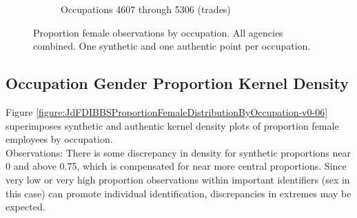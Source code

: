 \documentclass[10pt, letterpaper]{article}
\begin{document}
\begin{spacing}{1.0}
\begin{figure}[h]
\begin{subfigure}{1\textwidth}
        \caption{Occupations 4607 through 5306 (trades)}
        \vspace{10pt}
    \end{subfigure}
    \caption{Proportion female observations by occupation.  All agencies combined.  One synthetic and one authentic point per occupation.}
    \label{figure:JdFDIBBSOccupationProportionBar4}
\end{figure}

\clearpage

\subsection{Occupation Gender Proportion Kernel Density}

Figure \ref{figure:JdFDIBBSProportionFemaleDistributionByOccupation-v0-06} superimposes synthetic and authentic kernel density plots of proportion female employees by occupation.\\

Observations:  There is some discrepancy in density for synthetic proportions near 0 and above 0.75, which is compensated for near more central proportions.  Since very low or very high proportion observations within important identifiers (sex in this case) can promote individual identification, discrepancies in extremes may be expected.\\

\vspace{20pt}


\end{spacing}
\end{document}
